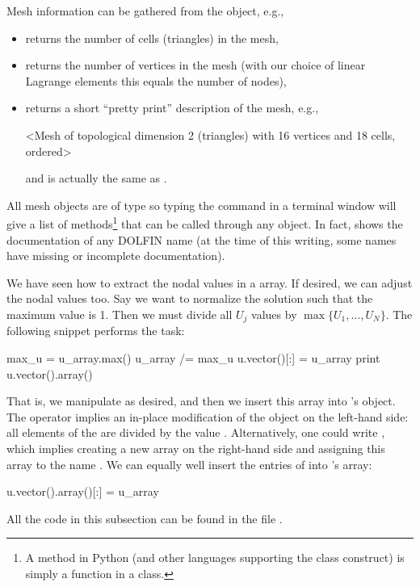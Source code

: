 Mesh information can be gathered from the  object, e.g.,
\begin{itemize}
  \item {} returns the number of cells (triangles)
  in the mesh,

  \item {} returns the number of vertices in
  the mesh (with our choice of linear Lagrange elements this equals the
  number of nodes),

  \item {} returns a short ``pretty print'' description of
  the mesh, e.g.,
\begin{progoutput}
<Mesh of topological dimension 2 (triangles) with
16 vertices and 18 cells, ordered>
\end{progoutput}
  \noindent
  and  is actually the same as .
\end{itemize}
All mesh objects are of type  so typing the command  in a terminal window will give a list
of methods\footnote{A method in Python (and other
  languages supporting the class construct) is simply a function in a
  class.} that can be called through any  object. In fact,
 shows the documentation of any DOLFIN name 
(at the time of this writing, some names have missing or incomplete
documentation).

We have seen how to extract the nodal values in a  array.
If desired, we can adjust the nodal values too. Say we want to normalize
the solution such that the maximum value is 1. Then we must divide all $U_j$
values by $\max\{U_1,\ldots,U_N\}$. The following snippet performs the task:
\begin{python}
max_u = u_array.max()
u_array /= max_u
u.vector()[:] = u_array
print u.vector().array()
\end{python}
That is, we manipulate  as desired, and then we insert
this array into 's  object.  The \emp{/=} operator
implies an in-place modification of the object on the left-hand side:
all elements of the  are divided by the value .
Alternatively, one could write , which implies creating a new array on the
right-hand side and assigning this array to the name .
We can equally well insert the entries of  into 's
 array:
\begin{python}
u.vector().array()[:] = u_array
\end{python}
All the code in this subsection can be found in the file
.

